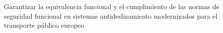 Garantizar la equivalencia funcional y el cumplimiento de las normas de seguridad funcional en sistemas antideslizamiento modernizados para el transporte público europeo